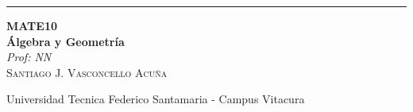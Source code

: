 
\begin{titlepage} %

	\raggedleft %

	\rule{1pt}{\textheight} %
	\hspace{0.05\textwidth} %
	\parbox[b]{0.75\textwidth}{ %

	{\Huge\bfseries MATE10 \\[0.5\baselineskip] Álgebra y Geometría}\\[2\baselineskip] %
	{\large\textit{Prof: NN}}\\[4\baselineskip] %
	{\Large\textsc{Santiago J. Vasconcello Acuña}} %

	\vspace{0.5\textheight} %

	{\noindent Universidad Tecnica Federico Santamaria - Campus Vitacura}\\[\baselineskip] %
	}

\end{titlepage}

